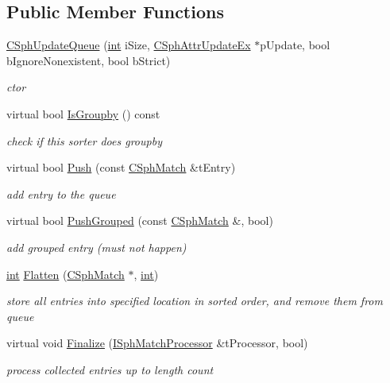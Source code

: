 \subsection*{Public Member Functions}
\begin{DoxyCompactItemize}
\item 
\hyperlink{classCSphUpdateQueue_a121f7795eb239d11e2d568c0b95dc955}{C\-Sph\-Update\-Queue} (\hyperlink{sphinxexpr_8cpp_a4a26e8f9cb8b736e0c4cbf4d16de985e}{int} i\-Size, \hyperlink{structCSphAttrUpdateEx}{C\-Sph\-Attr\-Update\-Ex} $\ast$p\-Update, bool b\-Ignore\-Nonexistent, bool b\-Strict)
\begin{DoxyCompactList}\small\item\em ctor \end{DoxyCompactList}\item 
virtual bool \hyperlink{classCSphUpdateQueue_aca4bd624a531e0471d0189e20e3ea0a6}{Is\-Groupby} () const 
\begin{DoxyCompactList}\small\item\em check if this sorter does groupby \end{DoxyCompactList}\item 
virtual bool \hyperlink{classCSphUpdateQueue_a92c971a39b2dfb53397421cfadeeb5a3}{Push} (const \hyperlink{classCSphMatch}{C\-Sph\-Match} \&t\-Entry)
\begin{DoxyCompactList}\small\item\em add entry to the queue \end{DoxyCompactList}\item 
virtual bool \hyperlink{classCSphUpdateQueue_a6b52d05f303b696b658a09c9680a2888}{Push\-Grouped} (const \hyperlink{classCSphMatch}{C\-Sph\-Match} \&, bool)
\begin{DoxyCompactList}\small\item\em add grouped entry (must not happen) \end{DoxyCompactList}\item 
\hyperlink{sphinxexpr_8cpp_a4a26e8f9cb8b736e0c4cbf4d16de985e}{int} \hyperlink{classCSphUpdateQueue_afdbc5d27744bca073f8cc1af17548a3c}{Flatten} (\hyperlink{classCSphMatch}{C\-Sph\-Match} $\ast$, \hyperlink{sphinxexpr_8cpp_a4a26e8f9cb8b736e0c4cbf4d16de985e}{int})
\begin{DoxyCompactList}\small\item\em store all entries into specified location in sorted order, and remove them from queue \end{DoxyCompactList}\item 
virtual void \hyperlink{classCSphUpdateQueue_a0be47ee92974e7c34cdbebcda4887a9c}{Finalize} (\hyperlink{structISphMatchProcessor}{I\-Sph\-Match\-Processor} \&t\-Processor, bool)
\begin{DoxyCompactList}\small\item\em process collected entries up to length count \end{DoxyCompactList}\end{DoxyCompactItemize}
